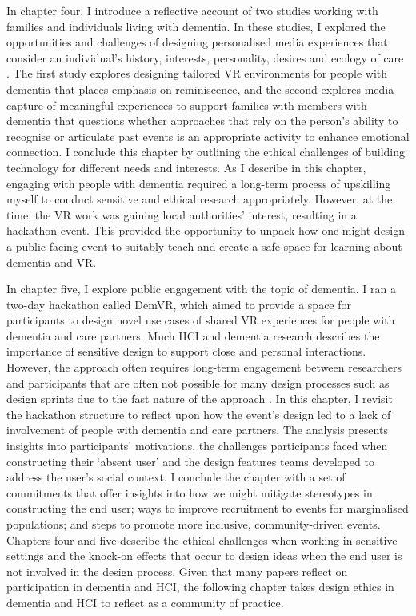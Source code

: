 In chapter four, I introduce a reflective account of two studies working with families and individuals living with dementia. In these studies, I explored the opportunities and challenges of designing personalised media experiences that consider an individual's history, interests, personality, desires and ecology of care \citep{ryan_dementia_2009}. The first study explores designing tailored VR environments for people with dementia that places emphasis on reminiscence, and the second explores media capture of meaningful experiences to support families with members with dementia that questions whether approaches that rely on the person's ability to recognise or articulate past events is an appropriate activity to enhance emotional connection. I conclude this chapter by outlining the ethical challenges of building technology for different needs and interests. As I describe in this chapter, engaging with people with dementia required a long-term process of upskilling myself to conduct sensitive and ethical research appropriately. However, at the time, the VR work was gaining local authorities' interest, resulting in a hackathon event. This provided the opportunity to unpack how one might design a public-facing event to suitably teach and create a safe space for learning about dementia and VR.

In chapter five, I explore public engagement with the topic of dementia. I ran a two-day hackathon called DemVR, which aimed to provide a space for participants to design novel use cases of shared VR experiences for people with dementia and care partners. Much HCI and dementia research describes the importance of sensitive design to support close and personal interactions. However, the approach often requires long-term engagement between researchers and participants that are often not possible for many design processes such as design sprints due to the fast nature of the approach \citep{braybrooke2021care}. In this chapter, I revisit the hackathon structure to reflect upon how the event's design led to a lack of involvement of people with dementia and care partners. The analysis presents insights into participants' motivations, the challenges participants faced when constructing their `absent user' and the design features teams developed to address the user's social context. I conclude the chapter with a set of commitments that offer insights into how we might mitigate stereotypes in constructing the end user; ways to improve recruitment to events for marginalised populations; and steps to promote more inclusive, community-driven events. Chapters four and five describe the ethical challenges when working in sensitive settings and the knock-on effects that occur to design ideas when the end user is not involved in the design process. Given that many papers reflect on participation in dementia and HCI, the following chapter takes design ethics in dementia and HCI to reflect as a community of practice.

